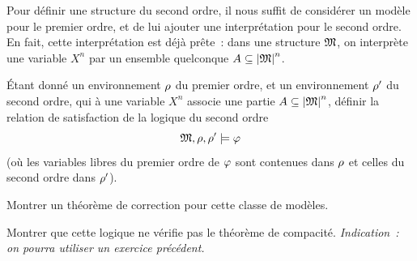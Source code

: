 \begin{problem}

  Pour définir une structure du second ordre, il nous suffit de considérer un
  modèle pour le premier ordre, et de lui ajouter une interprétation pour le
  second ordre. En fait, cette interprétation est déjà prête~: dans une
  structure $\mathfrak{M}$, on interprète une variable $X^n$ par un ensemble
  quelconque $A\subseteq\left\vert \mathfrak{M}\right\vert^n$.
  \begin{pbQuest}
  \item \'Etant donné un environnement $\rho$ du premier ordre, et un
    environnement $\rho'$ du second ordre, qui à une variable $X^n$ associe
    une partie $A\subseteq\left\vert \mathfrak{M}\right\vert^n$, définir la relation de satisfaction
    de la logique du second ordre
    \[\mathfrak{M},\rho,\rho'\models\varphi\]
    (où les variables libres du premier ordre de $\varphi$ sont contenues dans
    $\rho$ et celles du second ordre dans $\rho'$).
  \item Montrer un théorème de correction pour cette classe de modèles.
  \item Montrer que cette logique ne vérifie pas le théorème de compacité.
    \textit{Indication~: on pourra utiliser un exercice précédent.}
  \end{pbQuest}
\end{problem}
